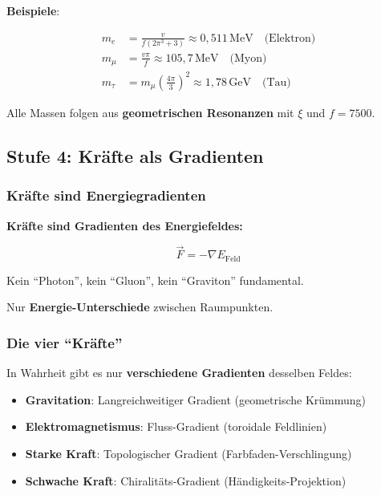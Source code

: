 	\textbf{Beispiele}:
	
	\begin{align}
		m_e &= \frac{v}{f(2\pi^3 + 3)} \approx 0{,}511\,\text{MeV} \quad \text{(Elektron)} \\
		m_\mu &= \frac{v\pi}{f} \approx 105{,}7\,\text{MeV} \quad \text{(Myon)} \\
		m_\tau &= m_\mu \left(\frac{4\pi}{3}\right)^2 \approx 1{,}78\,\text{GeV} \quad \text{(Tau)}
	\end{align}
	
	Alle Massen folgen aus \textbf{geometrischen Resonanzen} mit $\xi$ und $f = 7500$.
	
	\subsection{Stufe 4: Kräfte als Gradienten}
	
	\subsubsection{Kräfte sind Energiegradienten}
	
	\begin{keyresult}
		\textbf{Kräfte sind Gradienten des Energiefeldes:}
		
		\begin{equation}
			\boxed{\vec{F} = -\nabla E_{\text{Feld}}}
		\end{equation}
		
		\vspace{0.3cm}
		
		Kein \enquote{Photon}, kein \enquote{Gluon}, kein \enquote{Graviton} fundamental.
		
		Nur \textbf{Energie-Unterschiede} zwischen Raumpunkten.
	\end{keyresult}
	
	\subsubsection{Die vier \enquote{Kräfte}}
	
	In Wahrheit gibt es nur \textbf{verschiedene Gradienten} desselben Feldes:
	
	\begin{itemize}
		\item \textbf{Gravitation}: Langreichweitiger Gradient (geometrische Krümmung)
		\item \textbf{Elektromagnetismus}: Fluss-Gradient (toroidale Feldlinien)
		\item \textbf{Starke Kraft}: Topologischer Gradient (Farbfaden-Verschlingung)
		\item \textbf{Schwache Kraft}: Chiralitäts-Gradient (Händigkeits-Projektion)
	\end{itemize}
	
